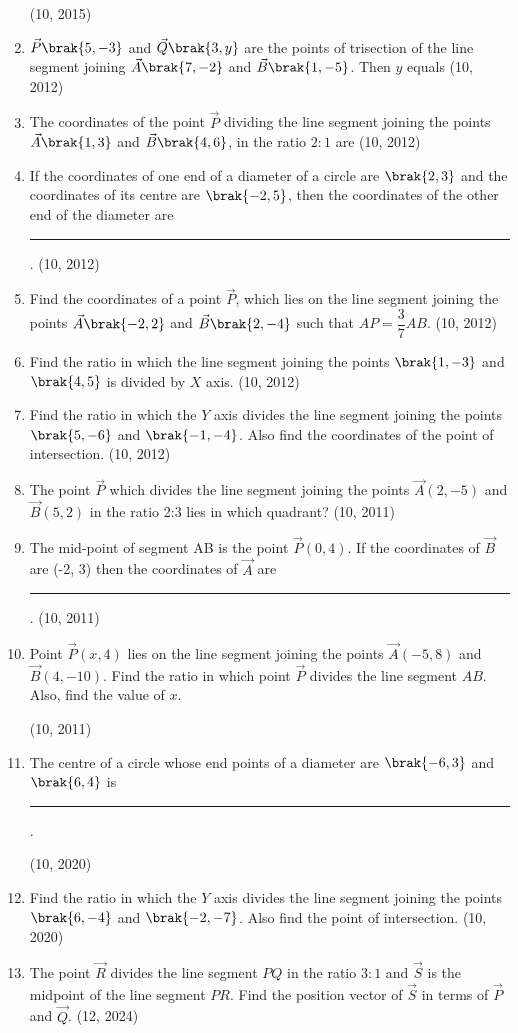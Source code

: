 \begin{enumerate}[label=\thesubsection.\arabic*,ref=\thesubsection.\theenumi]
		\hfill (10, 2015)
\item  $\vec{P}\brak{5,-3}$ and $\vec{Q}\brak{3,y}$ are the points of trisection of the line segment joining $\vec{A}\brak{7,-2}$ and $\vec{B}\brak{1,-5}$. Then $y$ equals
\hfill (10, 2012)
\item The coordinates of the point $\vec{P}$ dividing the line segment joining the points $\vec{A}\brak{1,3}$ and $\vec{B}\brak{4,6}$, in the ratio $2:1$ are
\hfill (10, 2012)
\item If the coordinates of one end of a diameter of a circle are $\brak{2,3}$ and the coordinates of its centre are $\brak{-2,5}$, then the coordinates of the other end of the diameter are
\rule{1cm}{0.2pt}.
\hfill (10, 2012)
\item Find the coordinates of a point $\vec{P}$, which lies on the line segment joining the points $\vec{A}\brak{-2,2}$ and $\vec{B}\brak{2,-4}$ such that $AP = \dfrac{3}{7} AB$. 
\hfill (10, 2012)
\item Find the ratio in which the line segment joining the points $\brak{1,-3}$ and $\brak{4,5}$ is divided by $X$ axis. 
\hfill (10, 2012)
\item Find the ratio in which the $Y$ axis divides the line segment joining the points $\brak{5,-6}$ and $\brak{-1,-4}$. Also find the coordinates of the point of intersection. 
\hfill (10, 2012)
    \item The point $\vec{P}$ which divides the line segment joining the points $\vec{A}(2, - 5)$ and $\vec{B}(5, 2)$ in the ratio 2:3 lies in which quadrant?
\hfill (10, 2011)
    \item The mid-point of segment AB is the point $\vec{P}( 0, 4)$. If the coordinates of $\vec{B}$ are (-2, 3) then the coordinates of $\vec{A}$ are \rule{1cm}{0.1pt}.
\hfill (10, 2011)
\item Point $\vec{P}(x, 4)$ lies on the line segment joining the points $\vec{A} (-5,8)$ and $\vec{B} (4, -10)$. Find the ratio in which point $\vec{P}$ divides the line segment $AB$. Also, find the value of $x$.

\hfill (10, 2011)
\item The centre of a circle whose end points of a diameter are $\brak{-6,3}$ and $\brak{6,4}$ is
\rule{1cm}{0.2pt}.

\hfill (10, 2020)
\item Find the ratio in which the $Y$ axis divides the line segment joining the points $\brak{6,-4}$ and $\brak{-2, -7}$. Also find the point of intersection.
\hfill (10, 2020)
\item  The point $\vec{R}$ divides the line segment $PQ$ in the ratio $3:1$ and $\vec{S}$ is the midpoint of the line segment $PR$. Find the position vector of $\vec{S}$ in terms of 
        $\vec{P}$ and  $\vec{Q}$.
		\hfill (12, 2024)
\end{enumerate}
